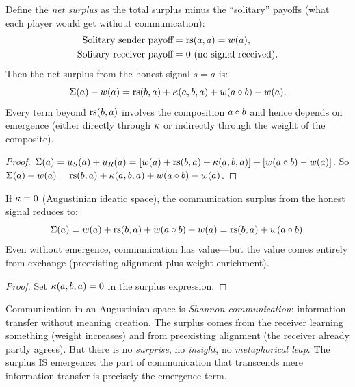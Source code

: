 \begin{theorem}
\label{thm:net-surplus-emergence}
Define the \emph{net surplus} as the total surplus minus the ``solitary''
payoffs (what each player would get without communication):
\begin{align*}
\text{Solitary sender payoff} &= \mathrm{rs}(a, a) = w(a), \\
\text{Solitary receiver payoff} &= 0 \text{ (no signal received)}.
\end{align*}
Then the net surplus from the honest signal $s = a$ is:
\[
\Sigma(a) - w(a) = \mathrm{rs}(b, a) + \kappa(a, b, a) + w(a \circ b) - w(a).
\]
Every term beyond $\mathrm{rs}(b, a)$ involves the composition $a \circ b$ and
hence depends on emergence (either directly through $\kappa$ or indirectly
through the weight of the composite).
\end{theorem}

\begin{proof}
$\Sigma(a) = u_S(a) + u_R(a) = [w(a) + \mathrm{rs}(b,a) + \kappa(a,b,a)] + [w(a \circ b) - w(a)]$.
So $\Sigma(a) - w(a) = \mathrm{rs}(b,a) + \kappa(a,b,a) + w(a \circ b) - w(a)$.
\end{proof}

\begin{theorem}
\label{thm:zero-emerge-surplus}
If $\kappa \equiv 0$ (Augustinian ideatic space), the communication surplus
from the honest signal reduces to:
\[
\Sigma(a) = w(a) + \mathrm{rs}(b, a) + w(a \circ b) - w(a) = \mathrm{rs}(b, a) + w(a \circ b).
\]
Even without emergence, communication has value---but the value comes entirely
from exchange (preexisting alignment plus weight enrichment).
\end{theorem}

\begin{proof}
Set $\kappa(a, b, a) = 0$ in the surplus expression.
\end{proof}

\begin{interpretation}
Communication in an Augustinian space is \emph{Shannon communication}:
information transfer without meaning creation. The surplus comes from the
receiver learning something (weight increases) and from preexisting alignment
(the receiver already partly agrees). But there is no \emph{surprise}, no
\emph{insight}, no \emph{metaphorical leap}. The surplus IS emergence: the
part of communication that transcends mere information transfer is precisely
the emergence term.
\end{interpretation}



